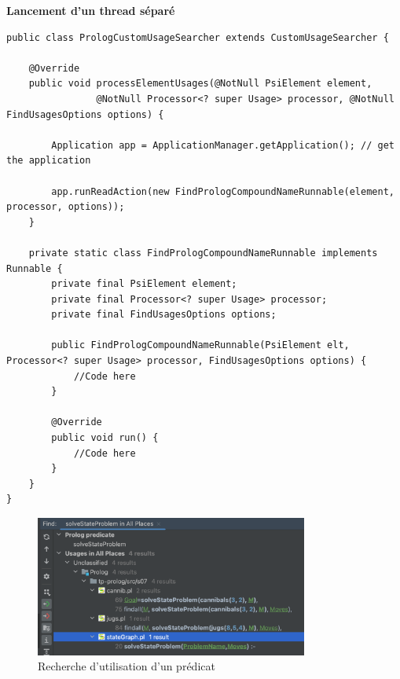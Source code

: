 \noindent \textbf{Lancement d'un thread séparé}
\begin{lstlisting}[label={lst:method_find_usages}, caption={Lancement d'un thread séparé}]
public class PrologCustomUsageSearcher extends CustomUsageSearcher {

    @Override
    public void processElementUsages(@NotNull PsiElement element,
                @NotNull Processor<? super Usage> processor, @NotNull FindUsagesOptions options) {

        Application app = ApplicationManager.getApplication(); // get the application

        app.runReadAction(new FindPrologCompoundNameRunnable(element, processor, options));
    }

    private static class FindPrologCompoundNameRunnable implements Runnable {
        private final PsiElement element;
        private final Processor<? super Usage> processor;
        private final FindUsagesOptions options;

        public FindPrologCompoundNameRunnable(PsiElement elt, Processor<? super Usage> processor, FindUsagesOptions options) {
            //Code here
        }

        @Override
        public void run() {
            //Code here
        }
    }
}
\end{lstlisting}

\begin{figure}[H]
    \centering
    \includegraphics[width=0.8\textwidth]{images/Find_Usage.png}
    \caption{Recherche d'utilisation d'un prédicat}
    \label{fig:usage}
\end{figure}